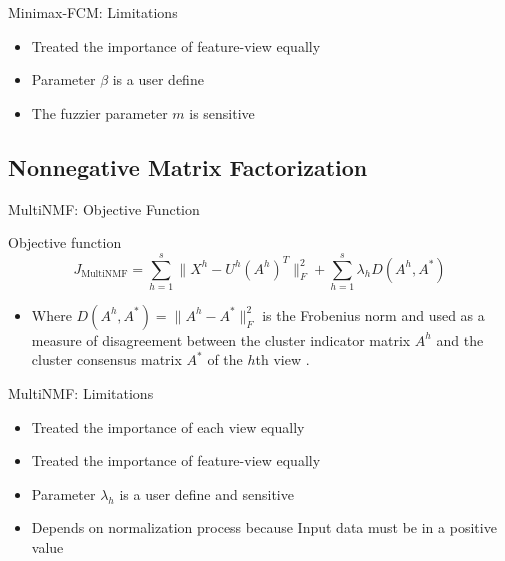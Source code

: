 \documentclass[compress,sky blue]{beamer}
\begin{document}

\begin{frame}{Minimax-FCM: Limitations}
	\vspace{-0.3cm}	
    
\begin{itemize}
\item Treated the importance of feature-view equally
\item Parameter $\beta$ is a user define
\item The fuzzier parameter $m$ is sensitive
\end{itemize}

\end{frame}



\subsection{Nonnegative Matrix Factorization}

\begin{frame}{MultiNMF: Objective Function}
	\vspace{-0.3cm}	
    
    Objective function     
\begin{equation}
J_{\text{MultiNMF}}  = \sum_{h=1}^{s} \Big \|X^{h}-U^{h} \left ( A^{h} \right )^{T} \Big \|_{F}^{2}  + \sum_{h=1}^{s} \lambda_{h} D \left( A^{h}, A^{*} \right )
\label{MinimaxFCM} 
\end{equation}
\begin{itemize}
\item Where $D \left( A^{h}, A^{*} \right) = \Big \| A^{h} - A^{*}\Big \|_{F}^{2}$  is the Frobenius norm and used as a measure of disagreement between the cluster indicator matrix  $A^{h}$ and the cluster consensus matrix $A^{*}$ of the $h$th view \cite{Liu2013Multi-viewFactorization}.
\end{itemize}



\end{frame}




\begin{frame}{MultiNMF: Limitations}
	\vspace{-0.3cm}	
    
\begin{itemize}
\item Treated the importance of each view equally
\item Treated the importance of feature-view equally
\item Parameter $\lambda_{h}$ is a user define and sensitive
\item Depends on normalization process because Input data must be in a positive value
\end{itemize}

\end{frame}
\end{document}

